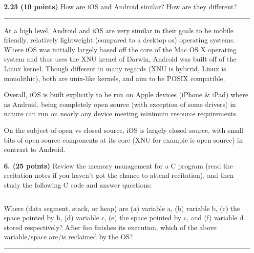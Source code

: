 \documentclass[12pt]{jhwhw}
\begin{document}
\clearpage
\textbf{2.23 (10 points)} How are iOS and Android similar? How are they different?
\textcolor[RGB]{240,240,240}{\rule{\textwidth}{0.5pt}}\bigbreak

	\begin{addmargin}[1em]{}
		At a high level, Android and iOS are very similar in their goals to be
		mobile friendly, relatively lightweight (compared to a desktop os) operating systems.
		Where iOS was initially largely based off the core of the Mac OS X operating system and
		thus uses the XNU kernel of Darwin, Android was built off of the Linux kernel.
		Though different in many regards (XNU is hybrrid, Linux is monolithic), both are
		unix-like kernels, and aim to be POSIX compatible. \\ \bigbreak

		Overall, iOS is built explicitly to be run on Apple devices (iPhone \& iPad) where as
		Android, being completely open source (with exception of some drivers) in nature can
		run on nearly any device meeting minimum resource requirements. \\ \bigbreak

		On the subject of open vs closed source, iOS is largely closed source, with small
		bits of open source components at its core (XNU for example is open source) in contrast
		to Android. \\
	\end{addmargin}

\bigbreak
\textbf{6. (25 points)} Review the memory management for a C program (read the recitation
notes if you haven't got the chance to attend recitation), and then study the following C
code and answer questions:
\inputminted{c}{p6.c}
Where (data segment, stack, or heap) are
	(a) variable a,
	(b) variable b,
	(c) the space pointed by b,
	(d) variable c,
	(e) the space pointed by c, and
	(f) variable d
stored respectively? After foo finishes its execution,
which of the above variable/space are/is reclaimed by the OS?
\textcolor[RGB]{240,240,240}{\rule{\textwidth}{0.5pt}}\bigbreak
\end{document}
